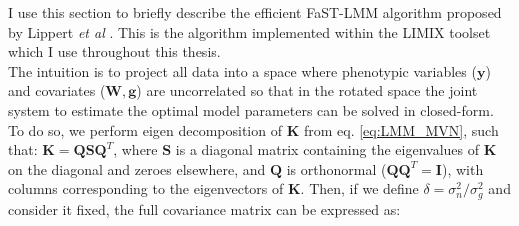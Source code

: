 




I use this section to  briefly describe the efficient FaST-LMM algorithm proposed by Lippert \textit{et al} \cite{lippert2011fast}.
This is the algorithm implemented within the LIMIX toolset \cite{lippert2014limix,casale2015efficient} which I use throughout this thesis.
\\

The intuition is to project all data into a space where phenotypic variables ($\mathbf{y}$) and covariates ($\mathbf{W}, \mathbf{g}$) are uncorrelated so that 
in the rotated 
space the joint system to estimate the optimal model parameters 
can be solved in closed-form.
To do so, we perform eigen decomposition of $\mathbf{K}$ from eq. \eqref{eq:LMM_MVN}, such that: $\mathbf{K} = \mathbf{Q}\mathbf{S}\mathbf{Q}^T$, where $\mathbf{S}$ is a diagonal matrix containing the eigenvalues of $\mathbf{K}$ on the diagonal and zeroes elsewhere, and $\mathbf{Q}$ is orthonormal ($\mathbf{Q}\mathbf{Q}^T = \mathbf{I}$), with columns corresponding to the eigenvectors of $\mathbf{K}$. 
Then, if we define $\delta = \sigma_n^2/\sigma_g^2$ and consider it fixed, the full covariance matrix can be expressed as:


